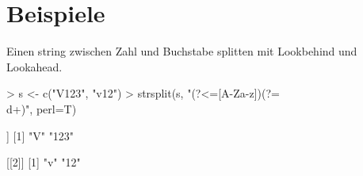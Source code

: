 \documentclass[a4paper]{report}
\begin{document}
\section{Beispiele}

Einen string zwischen Zahl und Buchstabe splitten mit Lookbehind und Lookahead.

\begin{Schunk}
\begin{Sinput}
> s <- c("V123", "v12")
> strsplit(s, "(?<=[A-Za-z])(?=\\d+)", perl=T)
\end{Sinput}
\begin{Soutput}
[[1]]
[1] "V"   "123"

[[2]]
[1] "v"  "12"
\end{Soutput}
\end{Schunk}
\end{document}
